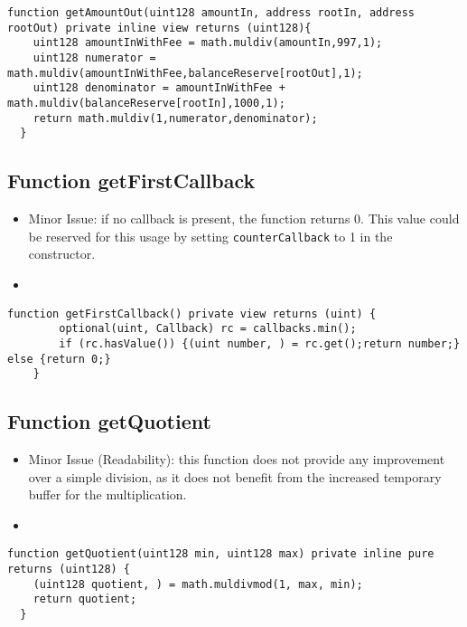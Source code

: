 \begin{lstlisting}[firstnumber=157]
  function getAmountOut(uint128 amountIn, address rootIn, address rootOut) private inline view returns (uint128){
    uint128 amountInWithFee = math.muldiv(amountIn,997,1);
    uint128 numerator = math.muldiv(amountInWithFee,balanceReserve[rootOut],1);
    uint128 denominator = amountInWithFee + math.muldiv(balanceReserve[rootIn],1000,1);
    return math.muldiv(1,numerator,denominator);
  }
\end{lstlisting}

\subsection{Function getFirstCallback}

\begin{itemize}
\item Minor Issue: if no callback is present, the function returns
  0. This value could be reserved for this usage by setting
  {\tt counterCallback} to 1 in the constructor.
\item \issueInternal
\end{itemize}

\begin{lstlisting}[firstnumber=242]
  function getFirstCallback() private view returns (uint) {
		optional(uint, Callback) rc = callbacks.min();
		if (rc.hasValue()) {(uint number, ) = rc.get();return number;} else {return 0;}
	}
\end{lstlisting}

\subsection{Function getQuotient}

\begin{itemize}
\item Minor Issue (Readability): this function does not provide any
  improvement over a simple division, as it does not benefit from the
  increased temporary buffer for the multiplication.
\item \issueInternal
\end{itemize}

\begin{lstlisting}[firstnumber=165]
  function getQuotient(uint128 min, uint128 max) private inline pure returns (uint128) {
    (uint128 quotient, ) = math.muldivmod(1, max, min);
    return quotient;
  }
\end{lstlisting}

